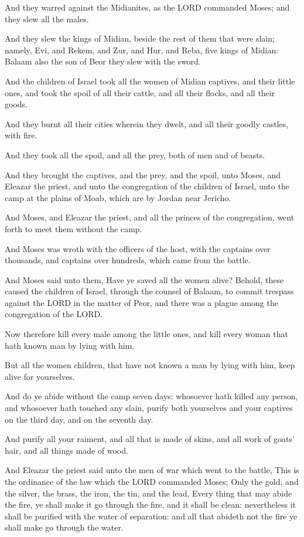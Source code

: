\verse And they warred against the Midianites, as the LORD commanded
Moses; and they slew all the males.

\verse And they slew the kings of Midian, beside the rest of them that
were slain; namely, Evi, and Rekem, and Zur, and Hur, and Reba, five
kings of Midian: Balaam also the son of Beor they slew with the sword.

\verse And the children of Israel took all the women of Midian captives,
and their little ones, and took the spoil of all their cattle, and all
their flocks, and all their goods.

\verse And they burnt all their cities wherein they dwelt, and all
their goodly castles, with fire.

\verse And they took all the spoil, and all the prey, both of men and
of beasts.

\verse And they brought the captives, and the prey, and the spoil, unto
Moses, and Eleazar the priest, and unto the congregation of the
children of Israel, unto the camp at the plains of Moab, which are by
Jordan near Jericho.

\verse And Moses, and Eleazar the priest, and all the princes of the
congregation, went forth to meet them without the camp.

\verse And Moses was wroth with the officers of the host, with the
captains over thousands, and captains over hundreds, which came from
the battle.

\verse And Moses said unto them, Have ye saved all the women alive?
\verse Behold, these caused the children of Israel, through the counsel
of Balaam, to commit trespass against the LORD in the matter of Peor,
and there was a plague among the congregation of the LORD.

\verse Now therefore kill every male among the little ones, and kill
every woman that hath known man by lying with him.

\verse But all the women children, that have not known a man by lying
with him, keep alive for yourselves.

\verse And do ye abide without the camp seven days: whosoever hath
killed any person, and whosoever hath touched any slain, purify both
yourselves and your captives on the third day, and on the seventh day.

\verse And purify all your raiment, and all that is made of skins, and
all work of goats' hair, and all things made of wood.

\verse And Eleazar the priest said unto the men of war which went to
the battle, This is the ordinance of the law which the LORD commanded
Moses; \verse Only the gold, and the silver, the brass, the iron, the
tin, and the lead, \verse Every thing that may abide the fire, ye shall
make it go through the fire, and it shall be clean: nevertheless it
shall be purified with the water of separation: and all that abideth
not the fire ye shall make go through the water.

